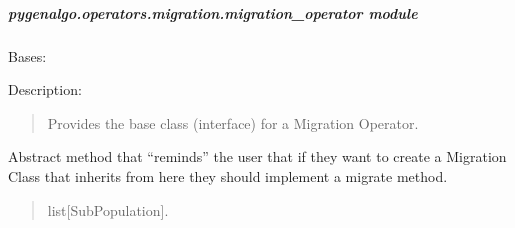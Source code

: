 \documentclass[letterpaper,10pt,english]{sphinxmanual}
\begin{document}
\subparagraph{pygenalgo.operators.migration.migration\_operator module}
\label{\detokenize{pygenalgo.operators.migration:module-pygenalgo.operators.migration.migration_operator}}\label{\detokenize{pygenalgo.operators.migration:pygenalgo-operators-migration-migration-operator-module}}

\begin{fulllineitems}
\label{\detokenize{pygenalgo.operators.migration:pygenalgo.operators.migration.migration_operator.MigrationOperator}}
\pysigstartsignatures
{}
\pysigstopsignatures
\sphinxAtStartPar
Bases: {\hyperref[\detokenize{pygenalgo.operators:pygenalgo.operators.genetic_operator.GeneticOperator}]{}}

\sphinxAtStartPar
Description:
\begin{quote}

\sphinxAtStartPar
Provides the base class (interface) for a Migration Operator.
\end{quote}

\begin{fulllineitems}
\label{\detokenize{pygenalgo.operators.migration:pygenalgo.operators.migration.migration_operator.MigrationOperator.migrate}}
\pysigstartsignatures
{}
\pysigstopsignatures
\sphinxAtStartPar
Abstract method that “reminds” the user that if they want to
create a Migration Class that inherits from here they should
implement a migrate method.
\begin{quote}\begin{description}
\sphinxAtStartPar
{} \textendash{} list{[}SubPopulation{]}.


\end{description}
\end{quote}
\end{fulllineitems}
\end{fulllineitems}
\end{document}
